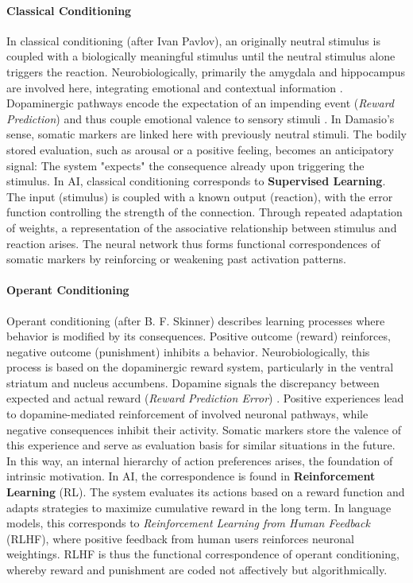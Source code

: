 \paragraph{Classical Conditioning}
In classical conditioning (after Ivan Pavlov), an originally neutral stimulus is coupled with a biologically meaningful stimulus until the neutral stimulus alone triggers the reaction.
Neurobiologically, primarily the amygdala and hippocampus are involved here, integrating emotional and contextual information \cite{LeDoux1996, Phelps2004}.
Dopaminergic pathways encode the expectation of an impending event (\emph{Reward Prediction}) and thus couple emotional valence to sensory stimuli \cite{Schultz1997}.
In Damasio's sense, somatic markers are linked here with previously neutral stimuli.
The bodily stored evaluation, such as arousal or a positive feeling, becomes an anticipatory signal: The system "expects" the consequence already upon triggering the stimulus.
In AI, classical conditioning corresponds to \textbf{Supervised Learning}.
The input (stimulus) is coupled with a known output (reaction), with the error function controlling the strength of the connection.
Through repeated adaptation of weights, a representation of the associative relationship between stimulus and reaction arises.
The neural network thus forms functional correspondences of somatic markers by reinforcing or weakening past activation patterns.

\paragraph{Operant Conditioning}
Operant conditioning (after B. F. Skinner) describes learning processes where behavior is modified by its consequences.
Positive outcome (reward) reinforces, negative outcome (punishment) inhibits a behavior.
Neurobiologically, this process is based on the dopaminergic reward system, particularly in the ventral striatum and nucleus accumbens.
Dopamine signals the discrepancy between expected and actual reward (\emph{Reward Prediction Error}) \cite{Schultz1997, Berridge1998}.
Positive experiences lead to dopamine-mediated reinforcement of involved neuronal pathways, while negative consequences inhibit their activity.
Somatic markers store the valence of this experience and serve as evaluation basis for similar situations in the future.
In this way, an internal hierarchy of action preferences arises, the foundation of intrinsic motivation.
In AI, the correspondence is found in \textbf{Reinforcement Learning} (RL).
The system evaluates its actions based on a reward function and adapts strategies to maximize cumulative reward in the long term.
In language models, this corresponds to \emph{Reinforcement Learning from Human Feedback} (RLHF), where positive feedback from human users reinforces neuronal weightings.
RLHF is thus the functional correspondence of operant conditioning, whereby reward and punishment are coded not affectively but algorithmically.

